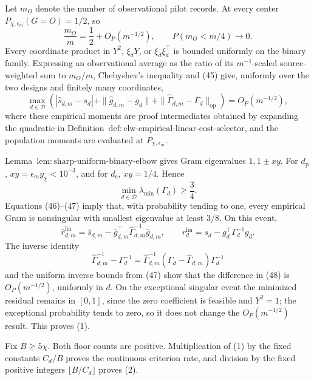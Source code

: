 Let \(m_O\) denote the number of observational pilot records.  At every center \(P_{\chi,\epsilon_m}(G=O)=1/2\), so
\[
 \frac{m_O}{m}=\frac12+O_P(m^{-1/2}),
 \qquad P(m_O<m/4)\longrightarrow0.                       \tag{45}
\]
Every coordinate product in \(Y^2\), \(\xi_dY\), or \(\xi_d\xi_d^\top\) is bounded uniformly on the binary family.  Expressing an observational average as the ratio of its \(m^{-1}\)-scaled source-weighted sum to \(m_O/m\), Chebyshev's inequality and (45) give, uniformly over the two designs and finitely many coordinates,
\[
 \max_{d\in\mathcal D}\left(
 |\widehat s_{d,m}-s_d|
 +\|\widehat g_{d,m}-g_d\|
 +\|\widehat\Gamma_{d,m}-\Gamma_d\|_{\mathrm{op}}
 \right)=O_P(m^{-1/2}),                                   \tag{46}
\]
where these empirical moments are proof intermediates obtained by expanding the quadratic in Definition~\(\mathrm{def{:}clw\text{-}empirical\text{-}linear\text{-}cost\text{-}selector}\), and the population moments are evaluated at \(P_{\chi,\epsilon_m}\).

Lemma~\(\mathrm{lem{:}sharp\text{-}uniform\text{-}binary\text{-}elbow}\) gives Gram eigenvalues \(1,1\pm xy\).  For \(d_{\mathrm p}\), \(xy=\epsilon_my_\chi<10^{-3}\), and for \(d_{\mathrm e}\), \(xy=1/4\).  Hence
\[
 \min_{d\in\mathcal D}\lambda_{\min}(\Gamma_d)\ge\frac34. \tag{47}
\]
Equations (46)--(47) imply that, with probability tending to one, every empirical Gram is nonsingular with smallest eigenvalue at least \(3/8\).  On this event,
\[
 \widehat r_{d,m}^{\mathrm{lin}}
 =\widehat s_{d,m}-\widehat g_{d,m}^\top
 \widehat\Gamma_{d,m}^{-1}\widehat g_{d,m},
 \qquad
 r_d^{\mathrm{lin}}=s_d-g_d^\top\Gamma_d^{-1}g_d.          \tag{48}
\]
The inverse identity
\[
 \widehat\Gamma_{d,m}^{-1}-\Gamma_d^{-1}
 =\widehat\Gamma_{d,m}^{-1}
 (\Gamma_d-\widehat\Gamma_{d,m})\Gamma_d^{-1}             \tag{49}
\]
and the uniform inverse bounds from (47) show that the difference in (48) is \(O_P(m^{-1/2})\), uniformly in \(d\).  On the exceptional singular event the minimized residual remains in \([0,1]\), since the zero coefficient is feasible and \(Y^2=1\); the exceptional probability tends to zero, so it does not change the \(O_P(m^{-1/2})\) result.  This proves (1).

Fix \(B\ge5\chi\).  Both floor counts are positive.  Multiplication of (1) by the fixed constants \(C_d/B\) proves the continuous criterion rate, and division by the fixed positive integers \(\lfloor B/C_d\rfloor\) proves (2).

